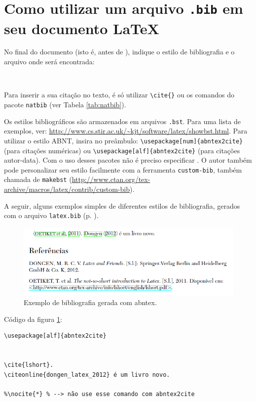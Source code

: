 \section{Como utilizar um arquivo \texttt{.bib} em seu documento \LaTeX}

No final do documento (isto é, antes de \verb++), indique o estilo de bibliografia e o arquivo onde será encontrada:

\begin{verbatim}


\end{verbatim}

Para inserir a sua citação no texto, é só utilizar \verb+\cite{}+ ou os comandos do pacote \texttt{natbib} (ver Tabela \ref{tab:natbib}).

Os estilos bibliográficos são armazenados em arquivos \texttt{.bst}. Para uma lista de exemplos, ver: \url{http://www.cs.stir.ac.uk/~kjt/software/latex/showbst.html}. Para utilizar o estilo ABNT, insira no preâmbulo: 
\verb+\usepackage[num]{abntex2cite}+ (para citações numéricas) ou \verb+\usepackage[alf]{abntex2cite}+ (para citações autor-data). Com o uso desses pacotes não é preciso especificar \verb++.
O autor também pode personalizar seu estilo facilmente com a ferramenta \texttt{custom-bib}, também chamada de \texttt{makebst} (\url{http://www.ctan.org/tex-archive/macros/latex/contrib/custom-bib}).


A seguir, alguns exemplos simples de diferentes estilos de bibliografia, gerados com o arquivo \texttt{latex.bib} (p. \pageref*{latex-bib}).



\begin{figure}
\centering
\includegraphics[width=0.7\linewidth]{./abntex-bibliografia-figura}
\caption{Exemplo de bibliografia gerada com abntex.}
\label{fig:abntex-bibliografia-figura}
\end{figure}

Código da figura \ref{fig:abntex-bibliografia-figura}:

\begin{verbatim}
\usepackage[alf]{abntex2cite}


\cite{lshort}.
\citeonline{dongen_latex_2012} é um livro novo.

%\nocite{*} % --> não use esse comando com abntex2cite



\end{verbatim}


